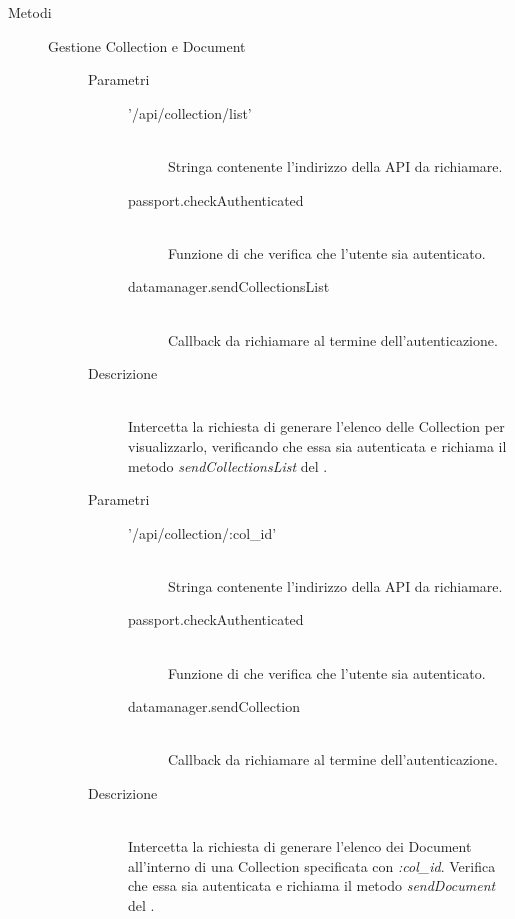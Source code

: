 \begin{description}
 \item[Metodi] \hfill
 \begin{description}
 \item[Gestione Collection e Document]
 \begin{mldescription}
   \hfill
  \begin{description}
   \item[Parametri] \hfill 
    \begin{description}
     \item['/api/collection/list'] \hfill \\
     Stringa contenente l'indirizzo della API da richiamare.
     \item[passport.checkAuthenticated] \hfill \\
     Funzione di  che verifica che l'utente sia autenticato.
     \item[datamanager.sendCollectionsList] \hfill \\
     Callback da richiamare al termine dell'autenticazione.
    \end{description}
   \item[Descrizione] \hfill \\
   Intercetta la richiesta di generare l'elenco delle Collection per visualizzarlo, verificando che essa sia autenticata e richiama il metodo \textit{sendCollectionsList} del .
  \end{description}
  
  \hfill 
  \begin{description}
   \item[Parametri] \hfill 
    \begin{description}
     \item['/api/collection/:col\_id'] \hfill \\
     Stringa contenente l'indirizzo della API da richiamare.
     \item[passport.checkAuthenticated] \hfill \\
     Funzione di  che verifica che l'utente sia autenticato.
     \item[datamanager.sendCollection] \hfill \\
     Callback da richiamare al termine dell'autenticazione.
    \end{description}
   \item[Descrizione] \hfill \\
  Intercetta la richiesta di generare l'elenco dei Document all'interno di una Collection specificata con \textit{:col\_id}. Verifica che essa sia autenticata e richiama il metodo \textit{sendDocument} del .
  \end{description}
  

\end{mldescription}
\end{description}
\end{description}
